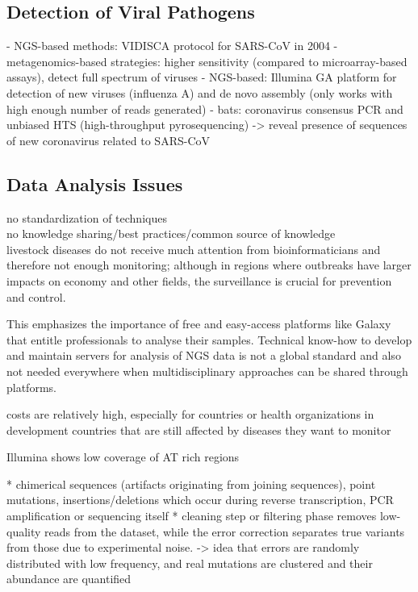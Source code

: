 \subsection{Detection of Viral Pathogens}
- NGS-based methods: VIDISCA protocol for SARS-CoV in 2004
- metagenomics-based strategies: higher sensitivity (compared to microarray-based assays), detect full spectrum of viruses
- NGS-based: Illumina GA platform for detection of new viruses (influenza A) and de novo assembly (only works with high enough number of reads generated)
- bats: coronavirus consensus PCR and unbiased HTS (high-throughput pyrosequencing) -> reveal presence of sequences of new coronavirus related to SARS-CoV

\subsection{Data Analysis Issues}

no standardization of techniques \\
no knowledge sharing/best practices/common source of knowledge \\
livestock diseases do not receive much attention from bioinformaticians and therefore not enough monitoring;
although in regions where outbreaks have larger impacts on economy and other fields, the surveillance is crucial for prevention and control.

This emphasizes the importance of free and easy-access platforms like Galaxy that entitle professionals to analyse their samples. Technical know-how to develop and maintain servers for analysis of NGS data is not a global standard and also not needed everywhere when multidisciplinary approaches can be shared through platforms.

costs are relatively high, especially for countries or health organizations in development countries that are still affected by diseases they want to monitor


Illumina shows low coverage of AT rich regions~\cite{harismendy2009evaluation}

* chimerical sequences (artifacts originating from joining sequences), point mutations, insertions/deletions which occur during reverse transcription, PCR amplification or sequencing itself
* cleaning step or filtering phase removes low-quality reads from the dataset, while the error correction separates true variants from those due to experimental noise. -> idea that errors are randomly distributed with low frequency, and real mutations are clustered and their abundance are quantified

